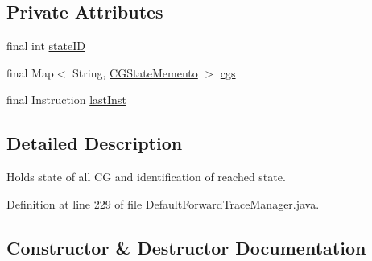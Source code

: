 \subsection*{Private Attributes}
\begin{DoxyCompactItemize}
\item 
final int \hyperlink{classgov_1_1nasa_1_1jpf_1_1inspector_1_1server_1_1breakpoints_1_1_default_forward_trace_manager_1_1_transition_memento_aaa03f77f3bc7914487b219ab28f0e517}{state\+ID}
\item 
final Map$<$ String, \hyperlink{classgov_1_1nasa_1_1jpf_1_1inspector_1_1server_1_1breakpoints_1_1_default_forward_trace_manager_1_1_c_g_state_memento}{C\+G\+State\+Memento} $>$ \hyperlink{classgov_1_1nasa_1_1jpf_1_1inspector_1_1server_1_1breakpoints_1_1_default_forward_trace_manager_1_1_transition_memento_a96e942cc8c232dfba1075ff9684c318a}{cgs}
\item 
final Instruction \hyperlink{classgov_1_1nasa_1_1jpf_1_1inspector_1_1server_1_1breakpoints_1_1_default_forward_trace_manager_1_1_transition_memento_aab42c70445c5e0138ece06c6f98906f1}{last\+Inst}
\end{DoxyCompactItemize}


\subsection{Detailed Description}
Holds state of all CG and identification of reached state. 

Definition at line 229 of file Default\+Forward\+Trace\+Manager.\+java.



\subsection{Constructor \& Destructor Documentation}
